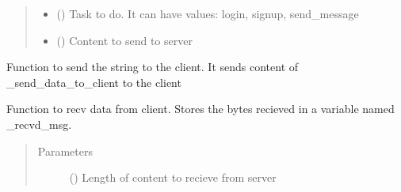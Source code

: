 \documentclass[letterpaper,10pt,english]{sphinxmanual}
\begin{document}
\begin{fulllineitems}
\begin{quote}
\begin{description}
\begin{itemize}
\item {} 
 () \textendash{} Task to do. It can have values: login, signup, send\_message

\item {} 
 () \textendash{} Content to send to server

\end{itemize}

\end{description}\end{quote}

\begin{fulllineitems}
\label{\detokenize{Message:Message.Message._send_data_to_client}}
Function to send the string to the client. It sends content of \_send\_data\_to\_client to the client

\end{fulllineitems}


\begin{fulllineitems}
\label{\detokenize{Message:Message.Message._recv_data_from_client}}
Function to recv data from client. Stores the bytes recieved in a variable named \_recvd\_msg.
\begin{quote}\begin{description}
\item[{Parameters}] \leavevmode
{} () \textendash{} Length of content to recieve from server

\end{description}\end{quote}

\end{fulllineitems}



\end{fulllineitems}
\end{document}
